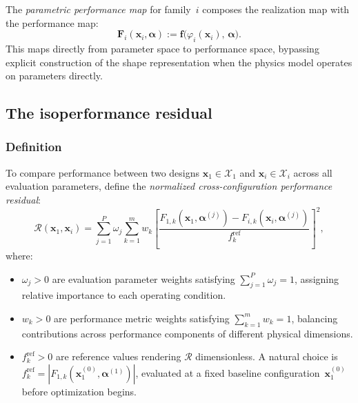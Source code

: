 The \emph{parametric performance map} for family~$i$ composes the realization map with the performance map:
\begin{equation}
    \mathbf{F}_i(\mathbf{x}_i, \boldsymbol{\alpha})
    := \mathbf{f}\bigl( \varphi_i(\mathbf{x}_i),\, \boldsymbol{\alpha} \bigr).
    \label{eq:param_perf_map}
\end{equation}
This maps directly from parameter space to performance space, bypassing explicit construction of the shape representation when the physics model operates on parameters directly.


\subsection{The isoperformance residual}
\label{sec:residual}

\subsubsection{Definition}

To compare performance between two designs $\mathbf{x}_1 \in \mathcal{X}_1$ and $\mathbf{x}_i \in \mathcal{X}_i$ across all evaluation parameters, define the \emph{normalized cross-configuration performance residual}:
\begin{equation}
    \mathcal{R}(\mathbf{x}_1, \mathbf{x}_i)
    = \sum_{j=1}^{P} \omega_j \sum_{k=1}^{m} w_k
    \left[ \frac{F_{1,k}(\mathbf{x}_1, \boldsymbol{\alpha}^{(j)})
               - F_{i,k}(\mathbf{x}_i, \boldsymbol{\alpha}^{(j)})}
              {f_k^{\mathrm{ref}}} \right]^2,
    \label{eq:residual}
\end{equation}
where:
\begin{itemize}
    \item $\omega_j > 0$ are evaluation parameter weights satisfying $\sum_{j=1}^{P} \omega_j = 1$, assigning relative importance to each operating condition.
    \item $w_k > 0$ are performance metric weights satisfying $\sum_{k=1}^{m} w_k = 1$, balancing contributions across performance components of different physical dimensions.
    \item $f_k^{\mathrm{ref}} > 0$ are reference values rendering $\mathcal{R}$ dimensionless. A natural choice is $f_k^{\mathrm{ref}} = |F_{1,k}(\mathbf{x}_1^{(0)}, \boldsymbol{\alpha}^{(1)})|$, evaluated at a fixed baseline configuration~$\mathbf{x}_1^{(0)}$ before optimization begins.
\end{itemize}


